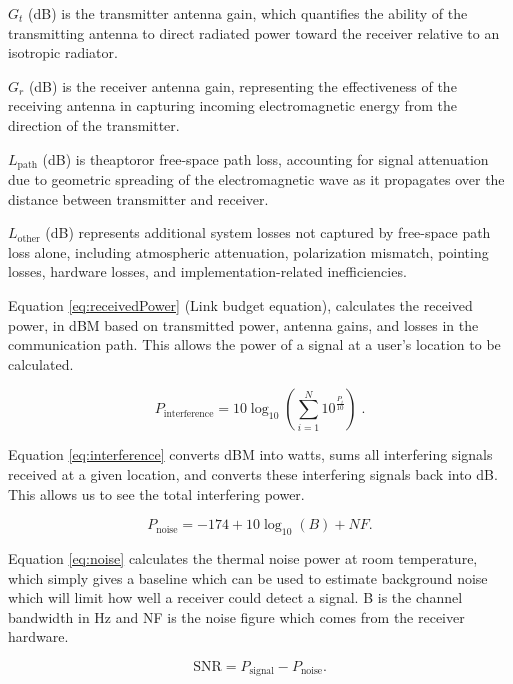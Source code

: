 \(G_t\) (dB) is the transmitter antenna gain, which quantifies the ability of the transmitting antenna to direct radiated power toward the receiver relative to an isotropic radiator.

\(G_r\) (dB) is the receiver antenna gain, representing the effectiveness of the receiving antenna in capturing incoming electromagnetic energy from the direction of the transmitter.

\(L_{\text{path}}\) (dB) is theaptoror free-space path loss, accounting for signal attenuation due to geometric spreading of the electromagnetic wave as it propagates over the distance between transmitter and receiver.

\(L_{\text{other}}\) (dB) represents additional system losses not captured by free-space path loss alone, including atmospheric attenuation, polarization mismatch, pointing losses, hardware losses, and implementation-related inefficiencies.

Equation \ref{eq:receivedPower} (Link budget equation), calculates the received power, in dBM based on transmitted power, antenna gains, and losses in the communication path. This allows the power of a signal at a user's location to be calculated. 

\begin{equation}
P_{\text{interference}} = 10 \log_{10} \left( \sum_{i=1}^{N} 10^{\frac{P_i}{10}} \right) \; .
\label{eq:interference}
\end{equation}

Equation \ref{eq:interference} \cite{goncharenko2023optimization} converts dBM into watts, sums all interfering signals received at a given location, and converts these interfering signals back into dB. This allows us to see the total interfering power. 

\begin{equation}
P_{\text{noise}} = -174 + 10 \log_{10}(B) + NF
\label{eq:noise}.
\end{equation}

Equation \ref{eq:noise} \cite{CEPTdoc1417}calculates the thermal noise power at room temperature, which simply gives a baseline which can be used to estimate background noise which will limit how well a receiver could detect a signal. B is the channel bandwidth in Hz and NF is the noise figure which comes from the receiver hardware.

\begin{equation}
\text{SNR} = P_{\text{signal}} - P_{\text{noise}}
\label{eq:snr}.
\end{equation}

